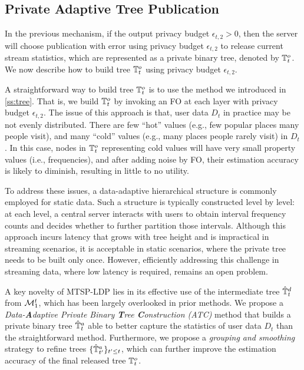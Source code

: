 \subsection{Private Adaptive Tree Publication}
\label{ss:tree_publication}

In the previous mechanism, if the output privacy budget $\epsilon_{t,2}>0$, then
the server will choose publication with error using privacy budget
$\epsilon_{t,2}$ to release current stream statistics, which are represented as
a private binary tree, denoted by $\mathbb{T}^o_t$.
We now describe how to build tree $\mathbb{T}^o_t$ using privacy budget $\epsilon_{t,2}$.

A straightforward way to build tree $\mathbb{T}^o_t$ is to use the method we introduced
in \cref{ss:tree}.
That is, we build $\mathbb{T}^o_t$ by invoking an FO at each layer with privacy budget $\epsilon_{t,2}$.
The issue of this approach is that, user data $D_t$ in practice may be not
evenly distributed.
There are few ``hot'' values (e.g., few popular places many people visit), and
many ``cold'' values (e.g., many places people rarely visit) in $D_t$.
In this case, nodes in $\mathbb{T}^o_t$ representing cold values will have very small
property values (i.e., frequencies), and after adding noise by FO, their
estimation accuracy is likely to diminish, resulting in little to no utility.

To address these issues, a data-adaptive hierarchical structure is commonly employed for static data. Such a structure is typically constructed level by level: at each level, a central server interacts with users to obtain interval frequency counts and decides whether to further partition those intervals. Although this approach incurs latency that grows with tree height and is impractical in streaming scenarios, it is acceptable in static scenarios, where the private tree needs to be built only once. However, efficiently addressing this challenge in streaming data, where low latency is required, remains an open problem.

A key novelty of MTSP-LDP lies in its effective use of the intermediate tree $\hat{\mathbb{T}}^d_t$ from $\mathcal{M}_1^t$, which has been largely overlooked in prior methods.
We propose a \emph{Data-\textbf{A}daptive Private Binary
  \textbf{T}ree \textbf{C}onstruction (ATC)} method that builds a private binary
tree $\hat{\mathbb{T}}^a_t$ able to better capture the statistics of user data $D_t$ than the
straightforward method.
Furthermore, we propose a \emph{grouping and smoothing} strategy to refine trees
$\{\hat{\mathbb{T}}^a_{t'}\}_{t'\leq t}$, which can further improve the estimation accuracy of
the final released tree $\mathbb{T}^o_t$.

